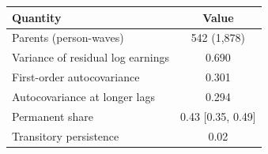 \begin{tabular}{@{}lc@{}}
\toprule
Quantity & Value \\
\midrule
Parents (person-waves) & 542 (1,878) \\
Variance of residual log earnings & 0.690 \\
First-order autocovariance & 0.301 \\
Autocovariance at longer lags & 0.294 \\
Permanent share & 0.43 [0.35, 0.49] \\
Transitory persistence & 0.02 \\
\bottomrule
\end{tabular}
